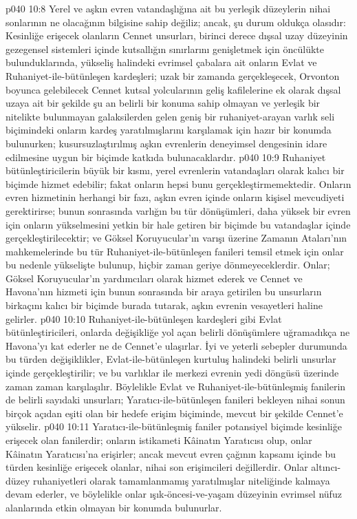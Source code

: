 \vs p040 10:8 Yerel ve aşkın evren vatandaşlığına ait bu yerleşik düzeylerin nihai sonlarının ne olacağının bilgisine sahip değiliz; ancak, şu durum oldukça olasıdır: Kesinliğe erişecek olanların Cennet unsurları, birinci derece dışsal uzay düzeyinin gezegensel sistemleri içinde kutsallığın sınırlarını genişletmek için öncülükte bulunduklarında, yükseliş halindeki evrimsel çabalara ait onların Evlat ve Ruhaniyet\hyp{}ile\hyp{}bütünleşen kardeşleri; uzak bir zamanda gerçekleşecek, Orvonton boyunca gelebilecek Cennet kutsal yolcularının geliş kafilelerine ek olarak dışsal uzaya ait bir şekilde şu an belirli bir konuma sahip olmayan ve yerleşik bir nitelikte bulunmayan galaksilerden gelen geniş bir ruhaniyet\hyp{}arayan varlık seli biçimindeki onların kardeş yaratılmışlarını karşılamak için hazır bir konumda bulunurken; kusursuzlaştırılmış aşkın evrenlerin deneyimsel dengesinin idare edilmesine uygun bir biçimde katkıda bulunacaklardır.
\vs p040 10:9 Ruhaniyet bütünleştiricilerin büyük bir kısmı, yerel evrenlerin vatandaşları olarak kalıcı bir biçimde hizmet edebilir; fakat onların hepsi bunu gerçekleştirmemektedir. Onların evren hizmetinin herhangi bir fazı, aşkın evren içinde onların kişisel mevcudiyeti gerektirirse; bunun sonrasında varlığın bu tür dönüşümleri, daha yüksek bir evren için onların yükselmesini yetkin bir hale getiren bir biçimde bu vatandaşlar içinde gerçekleştirilecektir; ve Göksel Koruyucular’ın varışı üzerine Zamanın Ataları’nın mahkemelerinde bu tür Ruhaniyet\hyp{}ile\hyp{}bütünleşen fanileri temsil etmek için onlar bu nedenle yükselişte bulunup, hiçbir zaman geriye dönmeyeceklerdir. Onlar; Göksel Koruyucular’ın yardımcıları olarak hizmet ederek ve Cennet ve Havona’nın hizmeti için bunun sonrasında bir araya getirilen bu unsurların birkaçını kalıcı bir biçimde burada tutarak, aşkın evrenin vesayetleri haline gelirler.
\vs p040 10:10 Ruhaniyet\hyp{}ile\hyp{}bütünleşen kardeşleri gibi Evlat bütünleştiricileri, onlarda değişikliğe yol açan belirli dönüşümlere uğramadıkça ne Havona’yı kat ederler ne de Cennet’e ulaşırlar. İyi ve yeterli sebepler durumunda bu türden değişiklikler, Evlat\hyp{}ile\hyp{}bütünleşen kurtuluş halindeki belirli unsurlar içinde gerçekleştirilir; ve bu varlıklar ile merkezi evrenin yedi döngüsü üzerinde zaman zaman karşılaşılır. Böylelikle Evlat ve Ruhaniyet\hyp{}ile\hyp{}bütünleşmiş fanilerin de belirli sayıdaki unsurları; Yaratıcı\hyp{}ile\hyp{}bütünleşen fanileri bekleyen nihai sonun birçok açıdan eşiti olan bir hedefe erişim biçiminde, mevcut bir şekilde Cennet’e yükselir.
\vs p040 10:11 Yaratıcı\hyp{}ile\hyp{}bütünleşmiş faniler potansiyel biçimde kesinliğe erişecek olan fanilerdir; onların istikameti Kâinatın Yaratıcısı olup, onlar Kâinatın Yaratıcısı’na erişirler; ancak mevcut evren çağının kapsamı içinde bu türden kesinliğe erişecek olanlar, nihai son erişimcileri değillerdir. Onlar altıncı\hyp{}düzey ruhaniyetleri olarak tamamlanmamış yaratılmışlar niteliğinde kalmaya devam ederler, ve böylelikle onlar ışık\hyp{}öncesi\hyp{}ve\hyp{}yaşam düzeyinin evrimsel nüfuz alanlarında etkin olmayan bir konumda bulunurlar.
